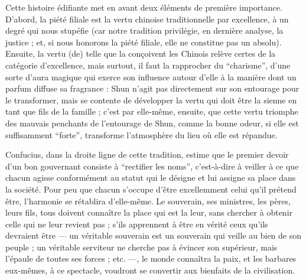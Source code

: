 \documentclass[11pt,a4paper]{article} %
\begin{document}
Cette histoire édifiante met en avant deux éléments de première importance.
D'abord, la
piété filiale est la vertu chinoise traditionnelle par excellence, à un degré qui nous stupéfie
(car notre tradition privilégie, en dernière analyse, la justice ; et, si nous honorons la piété
filiale, elle ne constitue pas un absolu).
Ensuite, la vertu (de) telle que la conçoivent les
Chinois relève certes de la catégorie d'excellence, mais surtout, il faut la rapprocher du
``charisme'', d'une sorte d'aura magique qui exerce son influence autour d'elle à la manière
dont un parfum diffuse sa fragrance : Shun n'agit pas directement sur son entourage
pour le transformer, mais se contente de développer la vertu qui doit être la sienne en tant
que fils de la famille ; c'est par elle-même, ensuite, que cette vertu triomphe des mauvais
penchants de l'entourage de Shun, comme la bonne odeur, si elle est suffisamment
``forte'', transforme l'atmosphère du lieu où elle est répandue.

Confucius, dans la droite ligne de cette tradition, estime que le premier devoir d'un bon
gouvernant consiste à ``rectifier les noms'', c'est-à-dire à veiller à ce que
chacun agisse conformément au statut qui le désigne et lui assigne sa place dans la société.
Pour peu que chacun s'occupe d'être excellemment celui qu'il prétend être, l'harmonie
se rétablira d'elle-même.
Le souverain, ses ministres, les pères, leurs fils, tous doivent
connaître la place qui est la leur, sans chercher à obtenir celle qui ne leur revient pas ; s'ils
apprennent à être en vérité ceux qu'ils devraient être --- un véritable souverain est un souverain
qui veille au bien de son peuple ; un véritable serviteur ne cherche pas à évincer
son supérieur, mais l'épaule de toutes ses forces ; etc. ---, le monde connaîtra la paix, et les
barbares eux-mêmes, à ce spectacle, voudront se convertir aux bienfaits de la civilisation.
\end{document}
